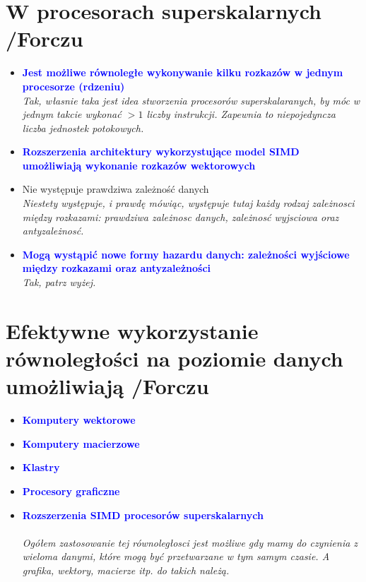 \documentclass[a4paper,twoside]{article}
\begin{document}
\section{W procesorach superskalarnych {\small /Forczu}}
	\begin{itemize}
    \item \textcolor{Blue}{\textbf{Jest możliwe równoległe wykonywanie kilku rozkazów w jednym procesorze (rdzeniu)}}\\
    {\small \emph{Tak, własnie taka jest idea stworzenia procesorów superskalaranych, by móc w jednym takcie wykonać $>1$ liczby instrukcji. Zapewnia to niepojedyncza liczba jednostek potokowych.}}
    \item \textcolor{Blue}{\textbf{Rozszerzenia architektury wykorzystujące model SIMD umożliwiają wykonanie rozkazów wektorowych}}
    \item Nie występuje prawdziwa zależność danych\\
    {\small \emph{Niestety występuje, i prawdę mówiąc, występuje tutaj każdy rodzaj zależnosci między rozkazami: prawdziwa zależnosc danych, zależnosć wyjsciowa oraz antyzależnosć.}}
    \item \textcolor{Blue}{\textbf{Mogą wystąpić nowe formy hazardu danych: zależności wyjściowe między rozkazami oraz antyzależności}}\\
    {\small \emph{Tak, patrz wyżej.}}
    \end{itemize}

\section{Efektywne wykorzystanie równoległości na poziomie danych umożliwiają {\small /Forczu}}
	\begin{itemize}
    \item \textcolor{Blue}{\textbf{Komputery wektorowe}}
    \item \textcolor{Blue}{\textbf{Komputery macierzowe}}
    \item \textcolor{Blue}{\textbf{Klastry}}
    \item \textcolor{Blue}{\textbf{Procesory graficzne}}
    \item \textcolor{Blue}{\textbf{Rozszerzenia SIMD procesorów superskalarnych}}\\\\
    {\small \emph{Ogółem zastosowanie tej równoległosci jest możliwe gdy mamy do czynienia z wieloma danymi, które mogą być przetwarzane w tym samym czasie. A grafika, wektory, macierze itp. do takich należą.}}
    \end{itemize}
\end{document}

